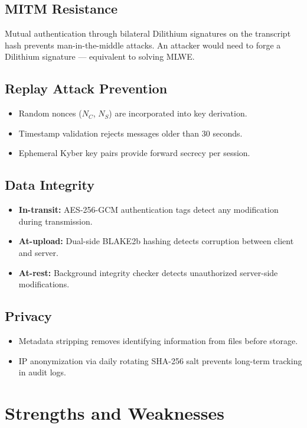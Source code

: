 \subsection{MITM Resistance}
Mutual authentication through bilateral Dilithium signatures on the transcript hash prevents man-in-the-middle attacks. An attacker would need to forge a Dilithium signature — equivalent to solving MLWE.

\subsection{Replay Attack Prevention}
\begin{itemize}
    \item Random nonces ($N_C$, $N_S$) are incorporated into key derivation.
    \item Timestamp validation rejects messages older than 30 seconds.
    \item Ephemeral Kyber key pairs provide forward secrecy per session.
\end{itemize}

\subsection{Data Integrity}
\begin{itemize}
    \item \textbf{In-transit:} AES-256-GCM authentication tags detect any modification during transmission.
    \item \textbf{At-upload:} Dual-side BLAKE2b hashing detects corruption between client and server.
    \item \textbf{At-rest:} Background integrity checker detects unauthorized server-side modifications.
\end{itemize}

\subsection{Privacy}
\begin{itemize}
    \item Metadata stripping removes identifying information from files before storage.
    \item IP anonymization via daily rotating SHA-256 salt prevents long-term tracking in audit logs.
\end{itemize}

\section{Strengths and Weaknesses}

